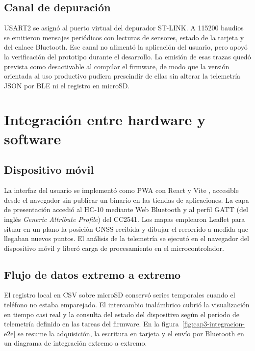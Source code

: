 \subsection{Canal de depuración}

USART2 se asignó al puerto virtual del depurador ST-LINK. A 115200 baudios se emitieron mensajes periódicos con lecturas de sensores, estado de la tarjeta y del enlace Bluetooth. Ese canal no alimentó la aplicación del usuario, pero apoyó la verificación del prototipo durante el desarrollo. La emisión de esas trazas quedó prevista como desactivable al compilar el firmware, de modo que la versión orientada al uso productivo pudiera prescindir de ellas sin alterar la telemetría JSON por BLE ni el registro en microSD.

\section{Integración entre hardware y software}
\label{sec:integracion-hw-sw}

\subsection{Dispositivo móvil}

La interfaz del usuario se implementó como PWA con React \citep{react} y Vite \citep{vite}, accesible desde el navegador sin publicar un binario en las tiendas de aplicaciones. La capa de presentación accedió al HC-10 mediante Web Bluetooth y al perfil GATT (del inglés \textit{Generic Attribute Profile}) del CC2541. Los mapas emplearon Leaflet \citep{leaflet} para situar en un plano la posición GNSS recibida y dibujar el recorrido a medida que llegaban nuevos puntos. El análisis de la telemetría se ejecutó en el navegador del dispositivo móvil y liberó carga de procesamiento en el microcontrolador.

\subsection{Flujo de datos extremo a extremo}

El registro local en CSV sobre microSD conservó series temporales cuando el teléfono no estaba emparejado. El intercambio inalámbrico cubrió la visualización en tiempo casi real y la consulta del estado del dispositivo según el período de telemetría definido en las tareas del firmware. En la figura~\ref{fig:cap3-integracion-e2e} se resume la adquisición, la escritura en tarjeta y el envío por Bluetooth en un diagrama de integración extremo a extremo.


